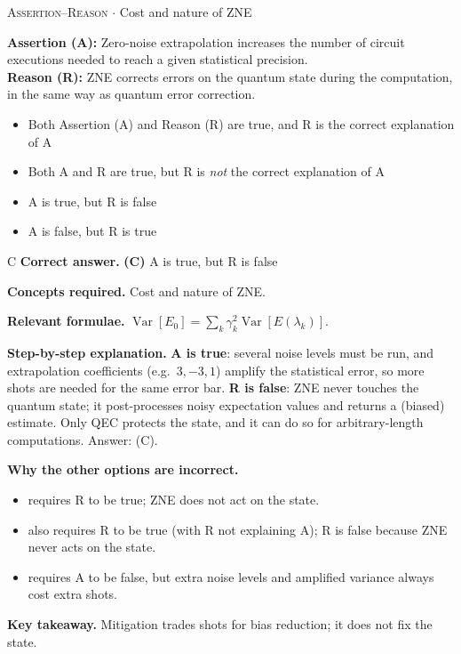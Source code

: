 \documentclass[11pt,a4paper]{article}
\newcommand{\optlabel}[1]{\textbf{(#1)}}
\newcommand{\correctlabel}[1]{\textcolor{okgreen}{\textbf{(#1)}\,\ding{51}}}
\newenvironment{qitem}[1]{\begin{list}{}{\setlength{\leftmargin}{3.3em}\setlength{\labelwidth}{3.1em}%
  \setlength{\labelsep}{0.2em}\setlength{\topsep}{3pt}\setlength{\parsep}{3pt}}\item[\textbf{Q.#1}\hfill]}{\end{list}}
\newcommand{\qsep}{\par\vspace{2pt}{\color{black!15}\hrule}\vspace{4pt}}
\newcommand{\qmeta}[2]{{\footnotesize\color{black!60}\textsc{#1} \;$\cdot$\; #2}\par}
\begin{document}
\begin{qitem}{77}
\qmeta{Assertion--Reason}{Cost and nature of ZNE}
\textbf{Assertion (A):} Zero-noise extrapolation increases the number of circuit executions needed to reach a given statistical precision.\\[1mm]
\textbf{Reason (R):} ZNE corrects errors on the quantum state during the computation, in the same way as quantum error correction.
\begin{itemize}[leftmargin=2.6em, labelsep=0.4em, itemsep=2pt, topsep=3pt]
\item[\optlabel{A}] Both Assertion (A) and Reason (R) are true, and R is the correct explanation of A
\item[\optlabel{B}] Both A and R are true, but R is \emph{not} the correct explanation of A
\item[\correctlabel{C}] A is true, but R is false
\item[\optlabel{D}] A is false, but R is true
\end{itemize}
\end{qitem}
\begin{solbox}{C}
\textbf{\color{brand}Correct answer.} \textcolor{okgreen}{\textbf{(C)}} A is true, but R is false

\textbf{\color{brand}Concepts required.} Cost and nature of ZNE.

\textbf{\color{brand}Relevant formulae.} $\operatorname{Var}[E_0] = \sum_k\gamma_k^2\operatorname{Var}[E(\lambda_k)]$.

\textbf{\color{brand}Step-by-step explanation.} \textbf{A is true}: several noise levels must be run, and extrapolation coefficients (e.g.\ $3, -3, 1$) amplify the statistical error, so more shots are needed for the same
error bar. \textbf{R is false}: ZNE never touches the quantum state; it post-processes noisy expectation values and returns a (biased) estimate. Only QEC protects the
state, and it can do so for arbitrary-length computations. Answer: (C).

\textbf{\color{brand}Why the other options are incorrect.}
\begin{itemize}[leftmargin=2.4em, itemsep=1pt, topsep=2pt]
\item[\textbf{(A)}] requires R to be true; ZNE does not act on the state.
\item[\textbf{(B)}] also requires R to be true (with R not explaining A); R is false because ZNE never acts on the state.
\item[\textbf{(D)}] requires A to be false, but extra noise levels and amplified variance always cost extra shots.
\end{itemize}
\textbf{\color{brand}Key takeaway.} Mitigation trades shots for bias reduction; it does not fix the state.
\end{solbox}
\qsep
\end{document}
